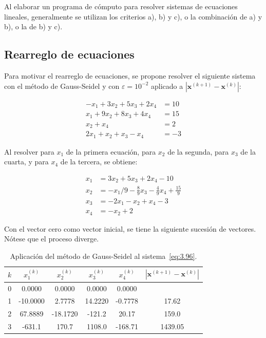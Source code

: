\documentclass[12pt,letterpaper]{article}
\theoremstyle{definition}
\theoremstyle{plain}
\theoremstyle{remark}
\begin{document}
Al elaborar un programa de cómputo para resolver sistemas de ecuaciones lineales, generalmente se utilizan los criterios a), b) y c), o la combinación de a) y b), o la de b) y c).

\subsection{Rearreglo de ecuaciones}

Para motivar el rearreglo de ecuaciones, se propone resolver el siguiente sistema con el método de Gauss-Seidel y con $\varepsilon = 10^{-2}$ aplicado a $|\mathbf{x}^{(k+1)} - \mathbf{x}^{(k)}|$:

\begin{equation}
\begin{aligned}
- x_1 + 3x_2 + 5x_3 + 2x_4 &= 10 \\
x_1 + 9x_2 + 8x_3 + 4x_4 &= 15 \\
x_2 + x_4 &= 2 \\
2x_1 + x_2 + x_3 - x_4 &= -3
\end{aligned}
\label{eq:3.96}
\tag{16}
\end{equation}

Al resolver para $x_1$ de la primera ecuación, para $x_2$ de la segunda, para $x_3$ de la cuarta, y para $x_4$ de la tercera, se obtiene:

\[
\begin{aligned}
x_1 &= 3x_2 + 5x_3 + 2x_4 - 10 \\
x_2 &= -x_1 / 9 - \frac{8}{9}x_3 - \frac{4}{9}x_4 + \frac{15}{9} \\
x_3 &= -2x_1 - x_2 + x_4 - 3 \\
x_4 &= -x_2 + 2
\end{aligned}
\]

Con el vector cero como vector inicial, se tiene la siguiente sucesión de vectores. Nótese que el proceso diverge.

\begin{table}[h!]
\centering
\caption{Aplicación del método de Gauss-Seidel al sistema~\eqref{eq:3.96}.}
\label{tab:3.3}
\begin{tabular}{c|c c c c|c}
$k$ & $x_1^{(k)}$ & $x_2^{(k)}$ & $x_3^{(k)}$ & $x_4^{(k)}$ & $|\mathbf{x}^{(k+1)} - \mathbf{x}^{(k)}|$ \\
\hline
0 & 0.0000 & 0.0000 & 0.0000 & 0.0000 & \\
1 & -10.0000 & 2.7778 & 14.2220 & -0.7778 & 17.62 \\
2 & 67.8889 & -18.1720 & -121.2 & 20.17 & 159.0 \\
3 & -631.1 & 170.7 & 1108.0 & -168.71 & 1439.05
\end{tabular}
\end{table}
\end{document}
